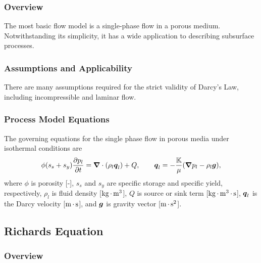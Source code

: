 \subsubsection{Overview}
\label{sec:single-phase-overview}

The most basic flow model is a single-phase flow in a porous medium.  
Notwithstanding its simplicity, it has a wide application to
describing subsurface processes.

\subsubsection{Assumptions and Applicability}

There are many assumptions required for the strict validity of Darcy's
Law, including incompressible and laminar flow.


\subsubsection{Process Model Equations}

The governing equations for the single phase flow in porous media 
under isothermal conditions are
\begin{equation}
  \phi (s_s + s_y) \frac{\partial p_l}{\partial t} 
  =
  \boldsymbol{\nabla} \cdot (\rho_l \boldsymbol{q}_l) + Q,
  \qquad
  {\boldsymbol{q}}_l = -\frac{{\mathbb K}}{\mu} 
  ({\boldsymbol{\nabla}} p_l - \rho_l {\boldsymbol{g}}),
\end{equation}
where $\phi$ is porosity [-],
$s_s$ and $s_y$ are specific storage and specific yield, respectively,
$\rho_l$ is fluid density [${\rm kg} {\,\cdot\,} {\rm m}^3$],
$Q$ is source or sink term [${\rm kg} {\,\cdot\,} {\rm m}^3 {\,\cdot\,} {\rm s}$],
${\boldsymbol{q}}_l$ is the Darcy velocity [${\rm m} {\,\cdot\,} {\rm s}$],
and ${\boldsymbol{g}}$ is gravity vector [${\rm m} {\,\cdot\,} {\rm s}^2$].



\subsection{Richards Equation}
\label{sec:richards-equation}

\subsubsection{Overview}
\label{sec:richards-overview}

